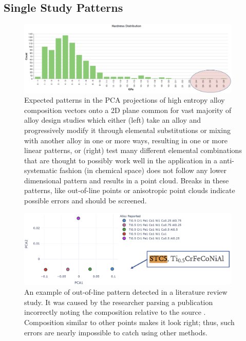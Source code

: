 \todo



\subsection{Single Study Patterns}   \label{pyqalloy:ssec:singlestudy}

\todo

\begin{figure}[H]
    \centering
    \includegraphics[width=0.95\textwidth]{pyqalloy/pyqalloy_extremevalues.png}
    \caption{Expected patterns in the PCA projections of high entropy alloy composition vectors onto a 2D plane common for vast majority of alloy design studies which either (left) take an alloy and progressively modify it through elemental substitutions or mixing with another alloy in one or more ways, resulting in one or more linear patterns, or (right) test many different elemental combinations that are thought to possibly work well in the application in a anti-systematic fashion (in chemical space) does not follow any lower dimensional pattern and results in a point cloud. Breaks in these patterns, like out-of-line points or anisotropic point clouds indicate possible errors and should be screened.}
    \label{pyqalloy:fig:expectedpatterns}
\end{figure}



\begin{figure}[H]
    \centering
    \includegraphics[width=0.95\textwidth]{pyqalloy/pyqalloy_HumanError.png}
    \caption{An example of out-of-line pattern detected in a literature review study. It was caused by the researcher parsing a publication incorrectly noting the composition relative to the source \cite{Wang2009AtomicAlloy}. Composition similar to other points makes it look right; thus, such errors are nearly impossible to catch using other methods.}
    \label{pyqalloy:fig:patternbreak1}
\end{figure}




